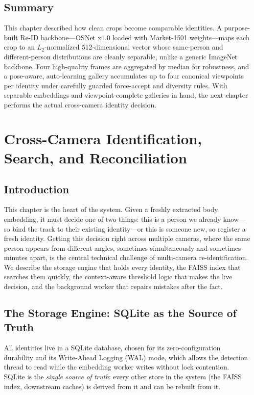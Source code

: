 \documentclass[12pt]{report}
\begin{document}
\section{Summary}
This chapter described how clean crops become comparable identities. A purpose-built Re-ID backbone---OSNet x1.0 loaded with Market-1501 weights---maps each crop to an $L_2$-normalized 512-dimensional vector whose same-person and different-person distributions are cleanly separable, unlike a generic ImageNet backbone. Four high-quality frames are aggregated by median for robustness, and a pose-aware, auto-learning gallery accumulates up to four canonical viewpoints per identity under carefully guarded force-accept and diversity rules. With separable embeddings and viewpoint-complete galleries in hand, the next chapter performs the actual cross-camera identity decision.

\newpage

\chapter{Cross-Camera Identification, Search, and Reconciliation}
\setcounter{section}{0}

\section{Introduction}
This chapter is the heart of the system. Given a freshly extracted body embedding, it must decide one of two things: this is a person we already know---so bind the track to their existing identity---or this is someone new, so register a fresh identity. Getting this decision right across multiple cameras, where the same person appears from different angles, sometimes simultaneously and sometimes minutes apart, is the central technical challenge of multi-camera re-identification. We describe the storage engine that holds every identity, the FAISS index that searches them quickly, the context-aware threshold logic that makes the live decision, and the background worker that repairs mistakes after the fact.

\section{The Storage Engine: SQLite as the Source of Truth}
All identities live in a SQLite database, chosen for its zero-configuration durability and its Write-Ahead Logging (WAL) mode, which allows the detection thread to read while the embedding worker writes without lock contention. SQLite is the \emph{single source of truth}: every other store in the system (the FAISS index, downstream caches) is derived from it and can be rebuilt from it.
\end{document}
